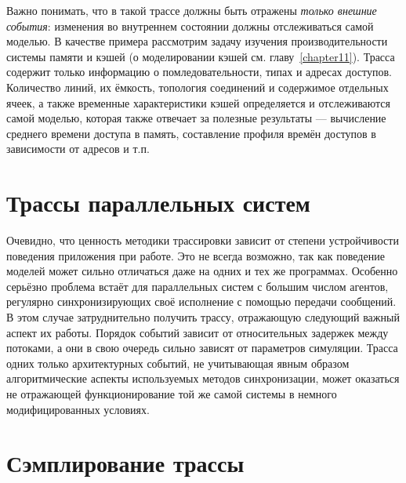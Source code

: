 Важно понимать, что в такой трассе должны быть отражены \textit{только внешние события}: изменения во внутреннем состоянии должны отслеживаться самой моделью. В качестве примера рассмотрим задачу изучения производительности системы памяти и кэшей (о моделировании кэшей см. главу~\ref{chapter11}). Трасса содержит только информацию о помледовательности, типах и адресах доступов. Количество линий, их ёмкость, топология соединений и содержимое отдельных ячеек, а также временные характеристики кэшей определяется и отслеживаются самой моделью, которая также отвечает за полезные результаты --- вычисление среднего времени доступа в память, составление профиля времён доступов в зависимости от адресов и т.п.


\section{Трассы параллельных систем}


Очевидно, что ценность методики трассировки зависит от степени устройчивости поведения приложения при работе. Это не всегда возможно, так как поведение моделей может сильно отличаться даже на одних и тех же программах. Особенно серьёзно проблема встаёт для параллельных систем с большим числом агентов, регулярно синхронизирующих своё исполнение с помощью передачи сообщений. В этом случае затруднительно получить трассу, отражающую следующий важный аспект их работы.  Порядок событий зависит от относительных задержек между потоками, а они в свою очередь сильно зависят от параметров симуляции. Трасса одних только архитектурных событий, не учитывающая явным образом алгоритмические аспекты используемых методов синхронизации, может оказаться не отражающей  функционирование той же самой системы в немного модифицированных условиях.

\section{Сэмплирование трассы}

